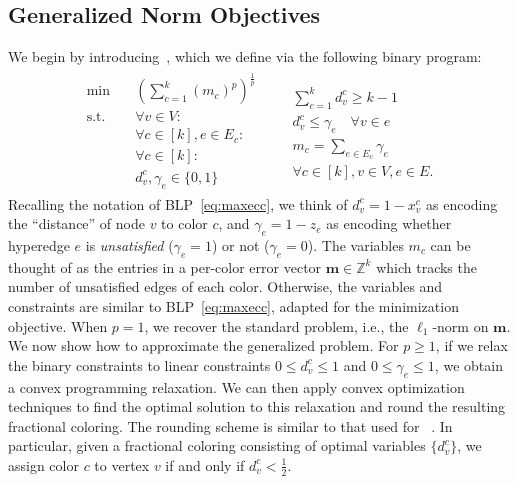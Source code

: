 \subsection{Generalized Norm Objectives}
\label{sec:generalized-mean}
We begin by introducing~\pmeanECC{}, which we define via the following binary program:
\begin{align}
	\label{eq:p-mean-ecc}
\begin{aligned}
	\text{min} \quad& \textstyle (\sum_{c = 1}^k (m_c)^p)^{\frac{1}{p}} \\
	\text{s.t.} \quad& \forall v \in V:\\
	&\forall c \in [k], e \in E_c:\\
    &\forall c \in [k]: \\
	&d_v^c, \gamma_e \in \{0, 1\}
\end{aligned}
\begin{aligned}
	&\\
	&\textstyle \sum_{c=1}^k d_v^c \geq k - 1 \\
	\quad &d_v^c \leq \gamma_e \quad \forall v \in e \\
    & m_c = \textstyle\sum_{e\in E_c}\gamma_e\\
	&\forall c \in [k], v \in V, e \in E.
\end{aligned}
\end{align}
Recalling the notation of BLP~\eqref{eq:maxecc}, we think of $d_v^c = 1 - x_v^c$ as encoding the ``distance'' of node $v$ to color $c$, and $\gamma_e = 1 - z_e$ as encoding whether hyperedge $e$ is \emph{unsatisfied} ($\gamma_e = 1$) or not ($\gamma_e = 0$).
The variables $m_c$ can be thought of as the entries in a per-color error vector $\textbf{m} \in \mathbb{Z}^k$ which tracks the number of unsatisfied edges of each color.
Otherwise, the variables and constraints are similar to BLP~\eqref{eq:maxecc}, adapted for the minimization objective. 
When $p = 1$, we recover the standard \minecc{} problem, i.e., the $\ell_1$-norm on $\textbf{m}$.
We now show how to approximate the generalized \pmeanECC{} problem.
For $p \geq 1$, if we relax the binary constraints to linear constraints $0 \leq d_v^c \leq 1$ and $0 \leq \gamma_e \leq 1$, we obtain a convex programming relaxation. We can then apply convex optimization techniques to find the optimal solution to this relaxation and round the resulting fractional coloring.
The rounding scheme is similar to that used for \minecc{}~\cite{amburg2020clustering}.
In particular, given a fractional coloring consisting of optimal variables $\{d_v^c\}$, we assign color $c$ to vertex $v$ if and only if $d_v^c < \frac{1}{2}$.
